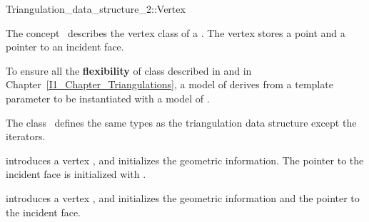 

\begin{ccRefConcept}{Triangulation_data_structure_2::Vertex}


\ccDefinition
  
The concept \ccRefName\ describes the vertex class of a
.
The vertex stores a point and a pointer to an incident face.

To ensure all the \textbf{flexibility} of class 
described in 
and in Chapter~\ref{I1_Chapter_Triangulations}, a model of 
\ccRefName derives from a template parameter
 to be instantiated with a model of 
.


\ccTypes
The class \ccRefName\ defines the same types as 
the triangulation data structure 
except the iterators.


\begin{ccAdvanced}
\ccCreation



{introduces a vertex \ccVar, and initializes the geometric information.
The pointer to the incident face is initialized with .}

{introduces a vertex \ccVar, and initializes the geometric information and 
the pointer to the incident face.}


\end{ccAdvanced}
\end{ccRefConcept}
